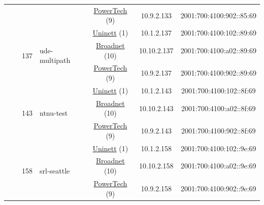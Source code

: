\begin{small}
\begin{center}
\begin{longtable}{|c|c|c|c|c|c|c|c|}
  &  &  &  & \multicolumn{2}{|c|}{\tiny{\href{http://www.powertech.no}{PowerTech} (9)}} & \tiny{10.9.2.133} & \tiny{2001:700:4100:902::85:69} \\* \cline{3-3}\cline{4-4}\cline{5-5}\cline{6-6}\cline{7-7}\cline{8-8}
  &  & \multirow{3}{*}{\tiny{137}} & \multicolumn{1}{|l|}{\multirow{3}{*}{\tiny{ude-multipath}}} & \multicolumn{2}{|c|}{\tiny{\href{https://www.uninett.no}{Uninett} (1)}} & \tiny{10.1.2.137} & \tiny{2001:700:4100:102::89:69} \\* \cline{5-5}\cline{6-6}\cline{7-7}\cline{8-8}
  &  &  &  & \multicolumn{2}{|c|}{\tiny{\href{https://www.broadnet.no}{Broadnet} (10)}} & \tiny{10.10.2.137} & \tiny{2001:700:4100:a02::89:69} \\* \cline{5-5}\cline{6-6}\cline{7-7}\cline{8-8}
  &  &  &  & \multicolumn{2}{|c|}{\tiny{\href{http://www.powertech.no}{PowerTech} (9)}} & \tiny{10.9.2.137} & \tiny{2001:700:4100:902::89:69} \\* \cline{3-3}\cline{4-4}\cline{5-5}\cline{6-6}\cline{7-7}\cline{8-8}
  &  & \multirow{3}{*}{\tiny{143}} & \multicolumn{1}{|l|}{\multirow{3}{*}{\tiny{ntnu-test}}} & \multicolumn{2}{|c|}{\tiny{\href{https://www.uninett.no}{Uninett} (1)}} & \tiny{10.1.2.143} & \tiny{2001:700:4100:102::8f:69} \\* \cline{5-5}\cline{6-6}\cline{7-7}\cline{8-8}
  &  &  &  & \multicolumn{2}{|c|}{\tiny{\href{https://www.broadnet.no}{Broadnet} (10)}} & \tiny{10.10.2.143} & \tiny{2001:700:4100:a02::8f:69} \\* \cline{5-5}\cline{6-6}\cline{7-7}\cline{8-8}
  &  &  &  & \multicolumn{2}{|c|}{\tiny{\href{http://www.powertech.no}{PowerTech} (9)}} & \tiny{10.9.2.143} & \tiny{2001:700:4100:902::8f:69} \\* \cline{3-3}\cline{4-4}\cline{5-5}\cline{6-6}\cline{7-7}\cline{8-8}
  &  & \multirow{3}{*}{\tiny{158}} & \multicolumn{1}{|l|}{\multirow{3}{*}{\tiny{srl-seattle}}} & \multicolumn{2}{|c|}{\tiny{\href{https://www.uninett.no}{Uninett} (1)}} & \tiny{10.1.2.158} & \tiny{2001:700:4100:102::9e:69} \\* \cline{5-5}\cline{6-6}\cline{7-7}\cline{8-8}
  &  &  &  & \multicolumn{2}{|c|}{\tiny{\href{https://www.broadnet.no}{Broadnet} (10)}} & \tiny{10.10.2.158} & \tiny{2001:700:4100:a02::9e:69} \\* \cline{5-5}\cline{6-6}\cline{7-7}\cline{8-8}
  &  &  &  & \multicolumn{2}{|c|}{\tiny{\href{http://www.powertech.no}{PowerTech} (9)}} & \tiny{10.9.2.158} & \tiny{2001:700:4100:902::9e:69} \\* \cline{3-3}\cline{4-4}\cline{5-5}\cline{6-6}\cline{7-7}\cline{8-8}

\end{longtable}
\end{center}
\end{small}
